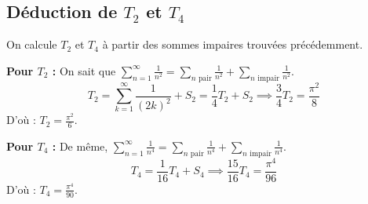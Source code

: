 \documentclass[french]{yLectureNote}
\begin{document}
\subsection{Déduction de $T_2$ et $T_4$}

On calcule $T_2$ et $T_4$ à partir des sommes impaires trouvées précédemment.

\textbf{Pour $T_2$ :}
On sait que $\sum_{n=1}^{\infty} \frac{1}{n^2} = \sum_{n \text{ pair}} \frac{1}{n^2} + \sum_{n \text{ impair}} \frac{1}{n^2}$.
\[
T_2 = \sum_{k=1}^{\infty} \frac{1}{(2k)^2} + S_2 = \frac{1}{4} T_2 + S_2 \implies \frac{3}{4} T_2 = \frac{\pi^2}{8}
\]
D'où : \textbf{$T_2 = \frac{\pi^2}{6}$}.

\textbf{Pour $T_4$ :}
De même, $\sum_{n=1}^{\infty} \frac{1}{n^4} = \sum_{n \text{ pair}} \frac{1}{n^4} + \sum_{n \text{ impair}} \frac{1}{n^4}$.
\[
T_4 = \frac{1}{16} T_4 + S_4 \implies \frac{15}{16} T_4 = \frac{\pi^4}{96}
\]
D'où : \textbf{$T_4 = \frac{\pi^4}{90}$}.
\end{document}
